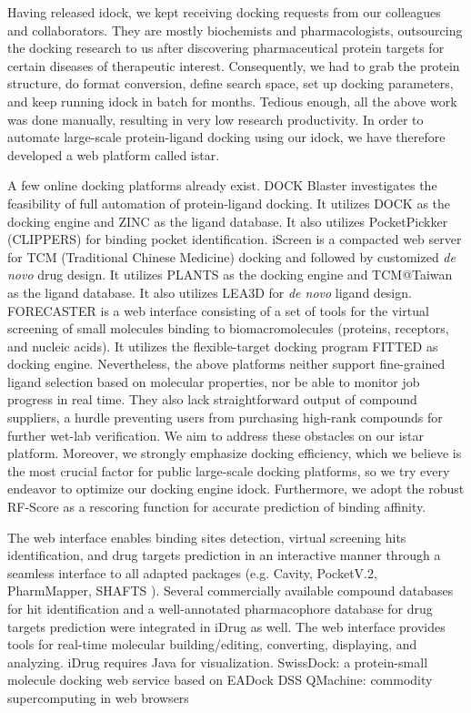 Having released idock, we kept receiving docking requests from our colleagues and collaborators. They are mostly biochemists and pharmacologists, outsourcing the docking research to us after discovering pharmaceutical protein targets for certain diseases of therapeutic interest. Consequently, we had to grab the protein structure, do format conversion, define search space, set up docking parameters, and keep running idock in batch for months. Tedious enough, all the above work was done manually, resulting in very low research productivity. In order to automate large-scale protein-ligand docking using our idock, we have therefore developed a web platform called istar.

A few online docking platforms already exist. DOCK Blaster \citep{557} investigates the feasibility of full automation of protein-ligand docking. It utilizes DOCK \citep{1222} as the docking engine and ZINC \citep{532,1178} as the ligand database. It also utilizes PocketPickker (CLIPPERS) \citep{395} for binding pocket identification. iScreen \citep{899} is a compacted web server for TCM (Traditional Chinese Medicine) docking and followed by customized \textit{de novo} drug design. It utilizes PLANTS \citep{610,607,779} as the docking engine and TCM@Taiwan \citep{528} as the ligand database. It also utilizes LEA3D \citep{1223} for \textit{de novo} ligand design. FORECASTER \citep{1012} is a web interface consisting of a set of tools for the virtual screening of small molecules binding to biomacromolecules (proteins, receptors, and nucleic acids). It utilizes the flexible-target docking program FITTED \citep{602} as docking engine. Nevertheless, the above platforms neither support fine-grained ligand selection based on molecular properties, nor be able to monitor job progress in real time. They also lack straightforward output of compound suppliers, a hurdle preventing users from purchasing high-rank compounds for further wet-lab verification. We aim to address these obstacles on our istar platform. Moreover, we strongly emphasize docking efficiency, which we believe is the most crucial factor for public large-scale docking platforms, so we try every endeavor to optimize our docking engine idock. Furthermore, we adopt the robust RF-Score \citep{564} as a rescoring function for accurate prediction of binding affinity.

\citep{1396} The web interface enables binding sites detection, virtual screening hits identification, and drug targets prediction in an interactive manner through a seamless interface to all adapted packages (e.g. Cavity, PocketV.2, PharmMapper, SHAFTS \citep{887}). Several commercially available compound databases for hit identification and a well-annotated pharmacophore database for drug targets prediction were integrated in iDrug as well. The web interface provides tools for real-time molecular building/editing, converting, displaying, and analyzing.
\citep{1396} iDrug requires Java for visualization.
\citep{1425} SwissDock: a protein-small molecule docking web service based on EADock DSS
\citep{1405} QMachine: commodity supercomputing in web browsers


